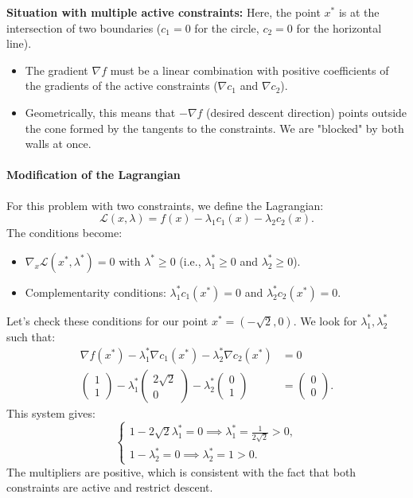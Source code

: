 \begin{figureexplanation}
\textbf{Situation with multiple active constraints:}
Here, the point $x^*$ is at the intersection of two boundaries ($c_1=0$ for the circle, $c_2=0$ for the horizontal line).
\begin{itemize}
    \item The gradient $\nabla f$ must be a linear combination with positive coefficients of the gradients of the active constraints ($\nabla c_1$ and $\nabla c_2$).
    \item Geometrically, this means that $-\nabla f$ (desired descent direction) points outside the cone formed by the tangents to the constraints. We are "blocked" by both walls at once.
\end{itemize}
\end{figureexplanation}

\paragraph{Modification of the Lagrangian}
For this problem with two constraints, we define the Lagrangian:
\begin{equation}
    \mathcal{L}(x, \lambda) = f(x) - \lambda_1 c_1(x) - \lambda_2 c_2(x).
\end{equation}
The conditions become:
\begin{itemize}
    \item $\nabla_x \mathcal{L}(x^*, \lambda^*) = 0$ with $\lambda^* \ge 0$ (i.e., $\lambda_1^* \ge 0$ and $\lambda_2^* \ge 0$).
    \item Complementarity conditions: $\lambda_1^* c_1(x^*) = 0$ and $\lambda_2^* c_2(x^*) = 0$.
\end{itemize}

Let's check these conditions for our point $x^* = (-\sqrt{2}, 0)$.
We look for $\lambda_1^*, \lambda_2^*$ such that:
\begin{align*}
    \nabla f(x^*) - \lambda_1^* \nabla c_1(x^*) - \lambda_2^* \nabla c_2(x^*) &= 0 \\
    \begin{pmatrix} 1 \\ 1 \end{pmatrix} - \lambda_1^* \begin{pmatrix} 2\sqrt{2} \\ 0 \end{pmatrix} - \lambda_2^* \begin{pmatrix} 0 \\ 1 \end{pmatrix} &= \begin{pmatrix} 0 \\ 0 \end{pmatrix}.
\end{align*}
This system gives:
\begin{equation}
    \begin{cases}
        1 - 2\sqrt{2} \lambda_1^* = 0 \implies \lambda_1^* = \frac{1}{2\sqrt{2}} > 0, \\
        1 - \lambda_2^* = 0 \implies \lambda_2^* = 1 > 0.
    \end{cases}
\end{equation}
The multipliers are positive, which is consistent with the fact that both constraints are active and restrict descent.
